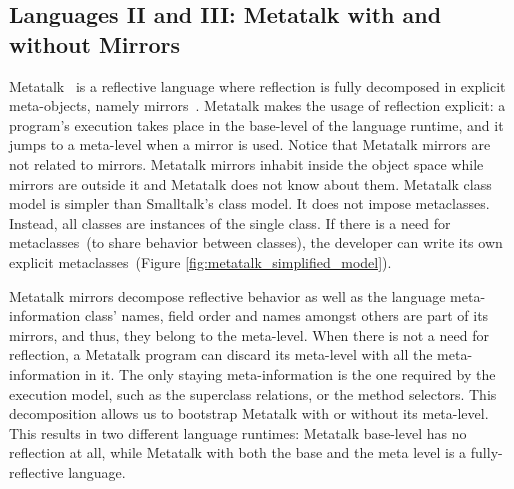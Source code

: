 


\subsection{Languages II and III: Metatalk with and without Mirrors} \label{sec:bootstrap_metatalk}

Metatalk~\cite{Papo11a} is a reflective language where reflection is fully decomposed in explicit meta-objects, namely mirrors~\cite{Brac04b}. Metatalk makes the usage of reflection explicit: a program's execution takes place in the base-level of the language runtime, and it jumps to a meta-level when a mirror is used. Notice that Metatalk mirrors are not related to \Vtt mirrors. Metatalk mirrors inhabit inside the object space while \Vtt mirrors are outside it and Metatalk does not know about them. Metatalk class model is simpler than Smalltalk's class model. It does not impose metaclasses. Instead, all classes are instances of the single  class. If there is a need for metaclasses~(to share behavior between classes), the developer can write its own explicit metaclasses~(Figure \ref{fig:metatalk_simplified_model}).

Metatalk mirrors decompose reflective behavior as well as the language meta-information \ie class' names, field order and names amongst others are part of its mirrors, and thus, they belong to the meta-level. When there is not a need for reflection, a Metatalk program can discard its meta-level with all the meta-information in it. The only staying meta-information is the one required by the \VMs execution model, such as the superclass relations, or the method selectors. This decomposition allows us to bootstrap Metatalk with or without its meta-level. This results in two different language runtimes: Metatalk base-level has no reflection at all, while Metatalk with both the base and the meta level is a fully-reflective language.

